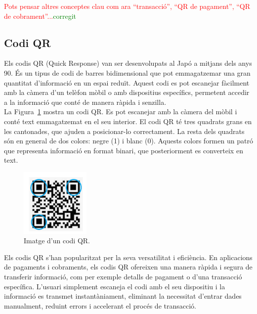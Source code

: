 \documentclass[a4paper,12pt,twoside]{ThesisStyle}
\newcommand{\pau}[1]{\textcolor{red}{#1}}
\newcommand{\sudan}[1]{\textcolor{green}{#1}}
\begin{document}
\pau{Pots pensar altres conceptes clau com ara ``transacció'', ``QR de pagament'', ``QR de cobrament''...}\sudan{corregit}



\subsection{Codi QR}
\label{subsec: Codi QR}

Els codis QR (Quick Response) van ser desenvolupats al Japó a mitjans dels anys 90. És un tipus de codi de barres bidimensional que pot emmagatzemar una gran quantitat d'informació en un espai reduït. Aquest codi es pot escanejar fàcilment amb la càmera d'un telèfon mòbil o amb dispositius específics, permetent accedir a la informació que conté de manera ràpida i senzilla.\\

La Figura~\ref{fig:Imatge d'un codi QR} mostra un codi QR. Es pot escanejar amb la càmera del mòbil i conté text emmagatzemat en el seu interior. El codi QR té tres quadrats grans en les cantonades, que ajuden a posicionar-lo correctament. La resta dels quadrats són en general de dos colors: negre (1) i blanc (0). Aquests colors formen un patró que representa informació en format binari, que posteriorment es converteix en text.

\begin{figure}[h!] %
    \centering
    \includegraphics[width=0.3\textwidth]{imatges/qr2.png} %
    \caption{Imatge d'un codi QR.} %
    \label{fig:Imatge d'un codi QR} %
  \end{figure}

Els codis QR s'han popularitzat per la seva versatilitat i eficiència. En aplicacions de pagaments i cobraments, els codis QR ofereixen una manera ràpida i segura de transferir informació, com per exemple detalls de pagament o d'una transacció específica. L'usuari simplement escaneja el codi amb el seu dispositiu i la informació es transmet instantàniament, eliminant la necessitat d'entrar dades manualment, reduint errors i accelerant el procés de transacció.\\
\end{document}
